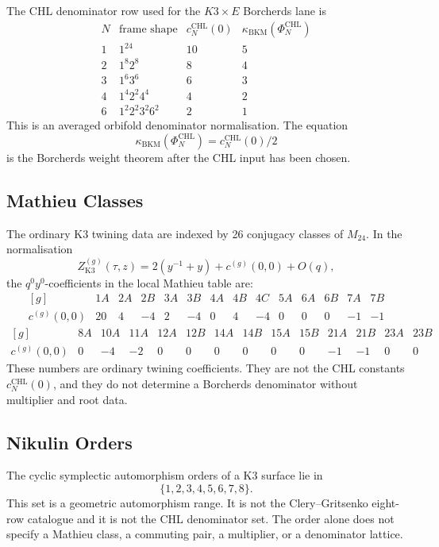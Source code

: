\documentclass[11pt]{article}
\providecommand{\kBKM}{\kappa_{\mathrm{BKM}}}
\providecommand{\Zg}{Z^{(g)}_{\mathrm{K3}}}
\begin{document}
The CHL denominator row used for the \(K3\times E\) Borcherds lane is
\[
\begin{array}{c|c|c|c}
N & \text{frame shape} & c_N^{\mathrm{CHL}}(0) &
\kBKM(\Phi_N^{\mathrm{CHL}})\\
\hline
1 & 1^{24} & 10 & 5\\
2 & 1^{8}2^{8} & 8 & 4\\
3 & 1^{6}3^{6} & 6 & 3\\
4 & 1^{4}2^{2}4^{4} & 4 & 2\\
6 & 1^{2}2^{2}3^{2}6^{2} & 2 & 1
\end{array}
\]
This is an averaged orbifold denominator normalisation.  The equation
\[
  \kBKM(\Phi_N^{\mathrm{CHL}})=c_N^{\mathrm{CHL}}(0)/2
\]
is the Borcherds weight theorem after the CHL input has been chosen.

\subsection{Mathieu Classes}

The ordinary K3 twining data are indexed by 26 conjugacy classes of
\(M_{24}\).  In the normalisation
\[
  \Zg(\tau,z)=2(y^{-1}+y)+c^{(g)}(0,0)+O(q),
\]
the \(q^0y^0\)-coefficients in the local Mathieu table are:
\[
\begin{array}{c|rrrrrrrrrrrrr}
[g] &1A&2A&2B&3A&3B&4A&4B&4C&5A&6A&6B&7A&7B\\
\hline
c^{(g)}(0,0)&20&4&-4&2&-4&0&4&-4&0&0&0&-1&-1
\end{array}
\]
\[
\begin{array}{c|rrrrrrrrrrrrr}
[g] &8A&10A&11A&12A&12B&14A&14B&15A&15B&21A&21B&23A&23B\\
\hline
c^{(g)}(0,0)&0&-4&-2&0&0&0&0&0&0&-1&-1&0&0
\end{array}
\]
These numbers are ordinary twining coefficients.  They are not the CHL
constants \(c_N^{\mathrm{CHL}}(0)\), and they do not determine a
Borcherds denominator without multiplier and root data.

\subsection{Nikulin Orders}

The cyclic symplectic automorphism orders of a K3 surface lie in
\[
  \{1,2,3,4,5,6,7,8\}.
\]
This set is a geometric automorphism range.  It is not the
Clery--Gritsenko eight-row catalogue and it is not the CHL denominator
set.  The order alone does not specify a Mathieu class, a commuting
pair, a multiplier, or a denominator lattice.
\end{document}
